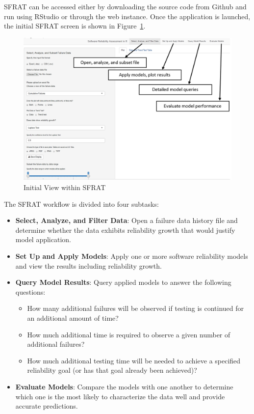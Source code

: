 \documentclass[journal]{IEEEtran}
\begin{document}
SFRAT can be accessed either by downloading the source code from Github and run using RStudio or through the web instance. Once the application is launched, the initial SFRAT screen is shown in Figure~\ref{fig_DefaultView}.
\begin{figure}[!h]
\centering
\includegraphics[width=\columnwidth]{Figures/DefaultView}
\caption{Initial View within SFRAT}
\label{fig_DefaultView}
\end{figure}


The SFRAT workflow is divided into four subtasks:
\begin{itemize}
\item{\textbf{Select, Analyze, and Filter Data}: Open a failure data history file and determine whether the data exhibits reliability growth that would justify model application.}
\item{\textbf{Set Up and Apply Models}: Apply one or more software reliability models and view the results including reliability growth.}
\item{\textbf{Query Model Results}: Query applied models to answer the following questions:
\begin{itemize}
\item{How many additional failures will be observed if testing is continued for an additional amount of time?}
\item{How much additional time is required to observe a given number of additional failures?}
\item{How much additional testing time will be needed to achieve a specified reliability goal (or has that goal already been achieved)?}
\end{itemize}}
\item{\textbf{Evaluate Models}: Compare the models with one another to determine which one is the most likely to characterize the data well and provide accurate predictions.}
\end{itemize}
\end{document}
